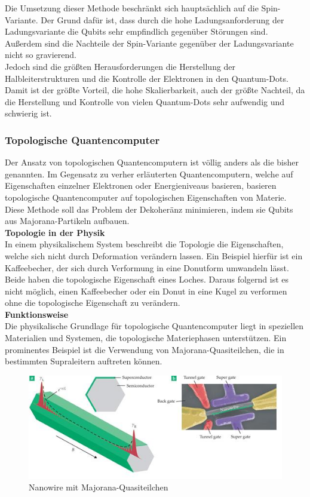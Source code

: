 Die Umsetzung dieser Methode beschränkt sich hauptsächlich auf die Spin-Variante. Der Grund dafür ist, dass durch die hohe Ladungsanforderung der Ladungsvariante die Qubits sehr empfindlich gegenüber Störungen sind.
Außerdem sind die Nachteile der Spin-Variante gegenüber der Ladungsvariante nicht so gravierend.\\
Jedoch sind die größten Herausforderungen die Herstellung der Halbleiterstrukturen und die Kontrolle der Elektronen in den Quantum-Dots.
Damit ist der größte Vorteil, die hohe Skalierbarkeit, auch der größte Nachteil, da die Herstellung und Kontrolle von vielen Quantum-Dots sehr aufwendig und schwierig ist.\\

\subsubsection{Topologische Quantencomputer}
\label{subsub:topologische_quantencomputer}
Der Ansatz von topologischen Quantencomputern ist völlig anders als die bisher genannten. Im Gegensatz zu verher erläuterten Quantencomputern, welche auf Eigenschaften einzelner Elektronen oder Energieniveaus basieren, basieren topologische Quantencomputer auf topologischen Eigenschaften von Materie.\\
Diese Methode soll das Problem der Dekoheränz minimieren, indem sie Qubits aus Majorana-Partikeln aufbauen.\\

\textbf{Topologie in der Physik}\\
In einem physikalischem System beschreibt die Topologie die Eigenschaften, welche sich nicht durch Deformation verändern lassen.
Ein Beispiel hierfür ist ein Kaffeebecher, der sich durch Verformung in eine Donutform umwandeln lässt. Beide haben die topologische Eigenschaft eines Loches.
Daraus folgernd ist es nicht möglich, einen Kaffeebecher oder ein Donut in eine Kugel zu verformen ohne die topologische Eigenschaft zu verändern.\\

\textbf{Funktionsweise}\\
Die physikalische Grundlage für topologische Quantencomputer liegt in speziellen Materialien und Systemen, die topologische Materiephasen unterstützen.
Ein prominentes Beispiel ist die Verwendung von Majorana-Quasiteilchen, die in bestimmten Supraleitern auftreten können.\\

\begin{figure}[H]
    \centering
    \includegraphics[width=0.75\linewidth]{img/Majorana.png}
    \caption{Nanowire mit Majorana-Quasiteilchen}
    \label{fig:Majorana}
\end{figure}

